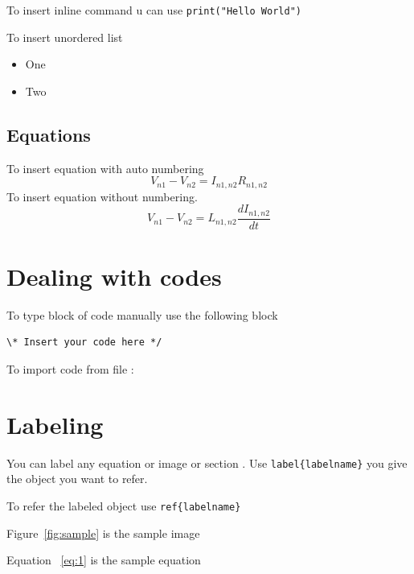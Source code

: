 \documentclass[11pt, a4paper, twoside]{article}
\begin{document}
  To insert inline command u can use \texttt{print("Hello World")}
  
  To insert unordered list
  \begin{itemize}
  	\item One
  	\item Two
  \end{itemize}
 
 
 \subsection{Equations}
 To insert equation with auto numbering
  \begin{equation}\label{eq:1}
  V_{n1}-V_{n2}=I_{n1,n2} R_{n1,n2}
  \end{equation}
  To insert equation without numbering.
\begin{equation*}
 V_{n1}-V_{n2}=L_{n1,n2} \frac{dI_{n1,n2}}{dt}
\end{equation*}

\section{Dealing with codes}
To type block of code manually use the following block
\begin{verbatim}	
\* Insert your code here */ 
\end{verbatim}
To import code from file : 


\section{Labeling}
You can label any equation or image or section . Use \texttt{label\{labelname\}}  you give the object you want to refer.

To refer the labeled object use \texttt{ref\{labelname\}}

Figure~\ref{fig:sample} is the sample image

Equation ~\ref{eq:1} is the sample equation 
\end{document}
